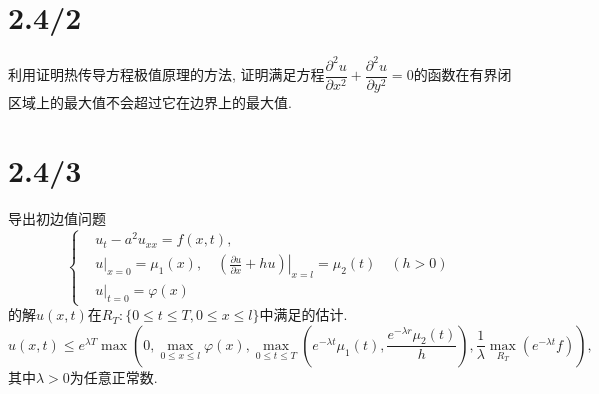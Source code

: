 \documentclass[11pt,a4paper]{article}
\begin{document}
\section{2.4/2}
\begin{problem}
利用证明热传导方程极值原理的方法, 证明满足方程$\dfrac{\partial^2u}{\partial x^2}+\dfrac{\partial^2u}{\partial y^2}=0$的函数在有界闭区域上的最大值不会超过它在边界上的最大值.
\end{problem}

\section{2.4/3}
\begin{problem}
导出初边值问题
$$\left\{\begin{aligned}
     & u_t-a^2u_{xx}=f(x,t),                                                                                        \\
     & u|_{x=0}=\mu_1(x),\quad \left.\left(\frac{\partial u}{\partial x}+hu\right)\right|_{x=l}=\mu_2(t)\quad (h>0) \\
     & u|_{t=0}=\varphi(x)
  \end{aligned}\right.$$
的解$u(x,t)$在$R_T:\{0\leqslant t\leqslant T,0\leqslant x\leqslant l\}$中满足的估计.
$$u(x,t)\leqslant e^{\lambda T}\max\left(0,\max_{0\leqslant x\leqslant l}\varphi(x),\max_{0\leqslant t\leqslant T}\left(e^{-\lambda t}\mu_1(t),\frac{e^{-\lambda r}\mu_2(t)}{h}\right),\frac{1}{\lambda}\max_{R_T}(e^{-\lambda t}f)\right),$$
其中$\lambda>0$为任意正常数.
\end{problem}
\end{document}

